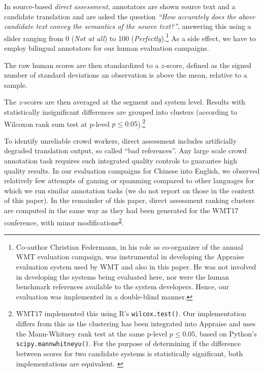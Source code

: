 \documentclass[a4paper]{article}
\begin{document}
\begin{CJK*}{UTF8}{gbsn}
In source-based \emph{direct assessment}, annotators are shown source text and a candidate translation and are asked the question \emph{``How accurately does the above candidate text convey the semantics of the source text?''}, answering this using a slider ranging from 0 (\emph{Not at all}) to 100 (\emph{Perfectly}).\footnote{Co-author Christian Federmann, in his role as co-organizer of the annual WMT evaluation campaign, was instrumental in developing the Appraise evaluation system used by WMT and also in this paper. He was not involved in developing the systems being evaluated here, nor were the human benchmark references available to the system developers. Hence, our evaluation was implemented in a double-blind manner.} As a side effect, we have to employ bilingual annotators for our human evaluation campaigns.


The raw human scores are then standardized to a $z$-score, defined as the signed number of standard deviations an observation is above the mean, relative to a sample.

The $z$-scores are then averaged at the segment and system level. Results with statistically insignificant differences are grouped into clusters (according to Wilcoxon rank sum test \cite{wilcoxon1945individual} at p-level $p \leq 0.05$).\footnote{WMT17 implemented this using R's \texttt{wilcox.test()}. Our implementation differs from this as the clustering has been integrated into Appraise and uses the Mann-Whitney rank test \cite{mann1947test} at the same p-level $p \leq 0.05$, based on Python's \texttt{scipy.mannwhitneyu()}. For the purpose of determining if the difference between scores for two candidate systems is statistically significant, both implementations are equivalent. \label{da-implementation-diffs}}



To identify unreliable crowd workers, direct assessment includes artificially degraded translation output, so called ``bad references''. Any large scale crowd annotation task requires such integrated quality controls to guarantee high quality results. In our evaluation campaigns for Chinese into English, we observed relatively few attempts of gaming or spamming compared to other languages for which we run similar annotation tasks (we do not report on those in the context of this paper). In the remainder of this paper, direct assessment ranking clusters are computed in the same way as they had been generated for the WMT17 conference, with minor modifications\textsuperscript{\ref{da-implementation-diffs}}.
 

\end{CJK*}
\end{document}
